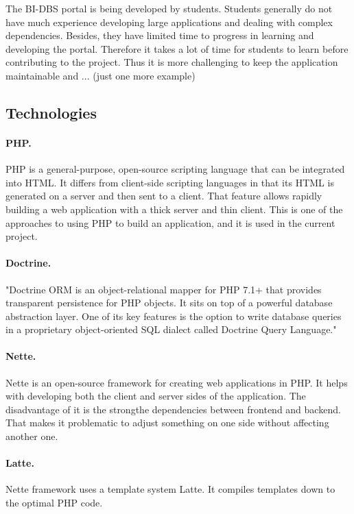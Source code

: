 \noindent The BI-DBS portal is being developed by students. Students generally do not have much experience developing large applications and dealing with complex dependencies. Besides, they have limited time to progress in learning and developing the portal. Therefore it takes a lot of time for students to learn before contributing to the project. Thus it is more challenging to keep the application maintainable and ... (just one more example)


\subsection{Technologies}
\paragraph*{PHP.} PHP is a general-purpose, open-source scripting language that can be integrated into HTML. It differs from client-side scripting languages in that its HTML is generated on a server and then sent to a client. That feature allows rapidly building a web application with a thick server and thin client. This is one of the approaches to using PHP to build an application, and it is used in the current project.

\paragraph*{Doctrine.} "Doctrine ORM is an object-relational mapper for PHP 7.1+ that provides transparent persistence for PHP objects. It sits on top of a powerful database abstraction layer. One of its key features is the option to write database queries in a proprietary object-oriented SQL dialect called Doctrine Query Language."


\paragraph*{Nette.} Nette is an open-source framework for creating web applications in PHP. It helps with developing both the client and server sides of the application. The disadvantage of it is the strongthe  dependencies  between frontend and backend. That makes it problematic to adjust something on one side without affecting another one.

\paragraph*{Latte.} Nette framework uses a template system Latte. It compiles templates down to the optimal PHP code. 

